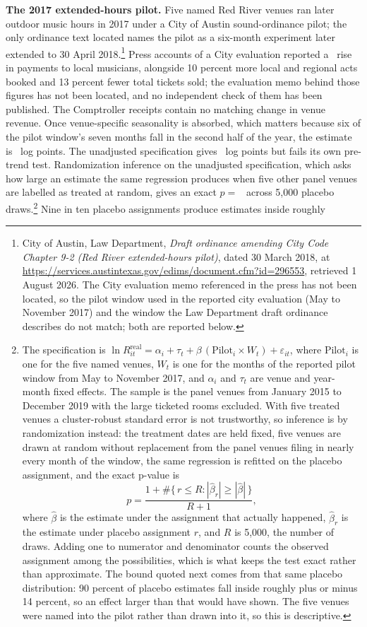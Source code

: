 \textbf{The 2017 extended-hours pilot.} Five named Red River venues ran later
outdoor music hours in 2017 under a City of Austin sound-ordinance pilot; the
only ordinance text located names the pilot as a six-month experiment later
extended to 30 April 2018.\footnote{City of Austin, Law Department, \textit{Draft
ordinance amending City Code Chapter 9-2 (Red River extended-hours pilot)},
dated 30 March 2018, at
\url{https://services.austintexas.gov/edims/document.cfm?id=296553}, retrieved
1 August 2026. The City evaluation memo referenced in the press has not been
located, so the pilot window used in the reported city evaluation (May to
November 2017) and the window the Law Department draft ordinance describes do
not match; both are reported below.} Press accounts of a City evaluation
reported a \NQuasiRedriverClaimUnverified\ rise in payments to local musicians,
alongside 10 percent more local and regional acts booked and 13 percent fewer
total tickets sold; the evaluation memo behind those figures has not been
located, and no independent check of them has been published. The Comptroller receipts
contain no matching change in venue revenue.
Once venue-specific seasonality is absorbed, which matters because six of the
pilot window's seven months fall in the second half of the year, the estimate
is \NQuasiRedriverDidSeasonadj\ log points. The unadjusted specification gives
\NQuasiRedriverDidCoef\ log points but fails its own pre-trend test.
Randomization inference on the unadjusted specification, which asks how large
an estimate the same regression produces when five other panel venues are
labelled as treated at random, gives an exact $p =$
\NQuasiRedriverRiP\ across 5,000 placebo draws.\footnote{The specification is
\(\ln R^{\mathrm{real}}_{it} = \alpha_i + \tau_t
   + \beta\,(\mathrm{Pilot}_i \times W_t) + \varepsilon_{it}\),
where \(\mathrm{Pilot}_i\) is one for the five named venues, \(W_t\) is one
for the months of the reported pilot window from May to November 2017, and
\(\alpha_i\) and \(\tau_t\) are venue and year-month fixed effects. The sample
is the panel venues from January 2015 to December 2019 with the large ticketed
rooms excluded. With five treated venues a cluster-robust standard error is
not trustworthy, so inference is by randomization instead: the treatment dates
are held fixed, five venues are drawn at random without replacement from the
panel venues filing in nearly every month of the window, the same regression is
refitted on the placebo assignment, and the exact p-value is
\[
p = \frac{1 + \#\{\,r \le R : |\hat\beta_r| \ge |\hat\beta|\,\}}{R + 1},
\]
where \(\hat\beta\) is the estimate under the assignment that actually
happened, \(\hat\beta_r\) is the estimate under placebo assignment \(r\), and
\(R\) is 5,000, the number of draws. Adding one to numerator and denominator
counts the observed assignment among the possibilities, which is what keeps
the test exact rather than approximate. The bound quoted next comes from that
same placebo distribution: 90 percent of placebo estimates fall inside roughly
plus or minus 14 percent, so an effect larger than that would have shown. The
five venues were named into the pilot rather than drawn into it, so this is
descriptive.} Nine in ten placebo assignments produce estimates inside roughly
